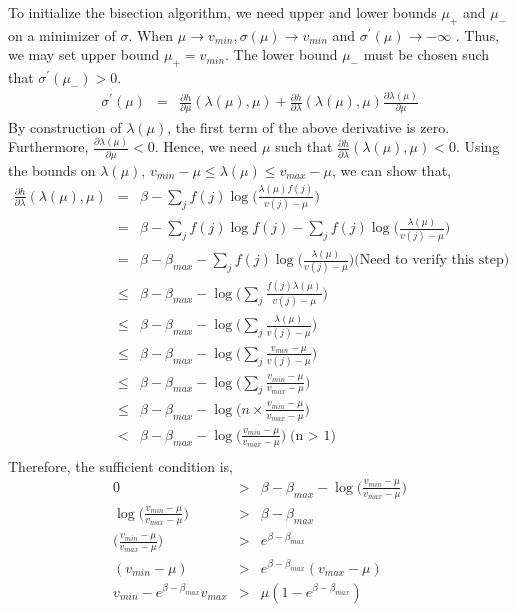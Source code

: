 To initialize the bisection algorithm, we need upper and lower bounds $\mu_+$ and $\mu_-$ on a minimizer of $\sigma$. When $\mu \rightarrow v_{min}, \sigma(\mu) \rightarrow v_{min}$ and $\sigma^{'}(\mu) \rightarrow -\infty$ . Thus, we may set upper bound $\mu_+ = v_{min}$. The lower bound $\mu_-$ must be chosen such that $\sigma^{'}(\mu_-) > 0$.
\begin{eqnarray*}
\sigma^{'}(\mu) &=& \frac{\partial h}{\partial \mu} (\lambda(\mu), \mu) + \frac{\partial h}{\partial \lambda} (\lambda(\mu), \mu) \frac{\partial \lambda(\mu)}{\partial \mu}
\end{eqnarray*}
By construction of $\lambda(\mu)$, the first term of the above derivative is zero. Furthermore, $\frac{\partial \lambda(\mu)}{\partial \mu} < 0$. Hence, we need $\mu$ such that $\frac{\partial h}{\partial \lambda} (\lambda(\mu), \mu) < 0$. Using the bounds on $\lambda(\mu)$, $v_{min} - \mu \leq \lambda(\mu) \leq v_{max} - \mu$, we can show that,
\begin{eqnarray*}
\frac{\partial h}{\partial \lambda} (\lambda(\mu), \mu) &=& \beta - \sum_{j}f(j) \log\bigg(\frac{\lambda(\mu) f(j)}{v(j) - \mu}\bigg) \\
&=& \beta - \sum_{j}f(j)\log f(j) - \sum_{j}f(j)\log\bigg(\frac{\lambda(\mu)}{v(j) - \mu}\bigg) \\
&=& \beta - \beta_{max} - \sum_{j}f(j)\log\bigg(\frac{\lambda(\mu)}{v(j) - \mu}\bigg) \textrm{(Need to verify this step)}\\
&\leq& \beta - \beta_{max} - \log\bigg(\sum_{j}\frac{f(j)\lambda(\mu)}{v(j) - \mu}\bigg) \\
&\leq& \beta - \beta_{max} - \log\bigg(\sum_{j}\frac{\lambda(\mu)}{v(j) - \mu}\bigg) \\
&\leq& \beta - \beta_{max} - \log\bigg(\sum_{j}\frac{v_{min} - \mu}{v(j) - \mu}\bigg) \\
&\leq& \beta - \beta_{max} - \log\bigg(\sum_{j}\frac{v_{min} - \mu}{v_{max} - \mu}\bigg) \\
&\leq& \beta - \beta_{max} - \log\bigg(n \times \frac{v_{min} - \mu}{v_{max} - \mu}\bigg) \\
&<& \beta - \beta_{max} - \log\bigg(\frac{v_{min} - \mu}{v_{max} - \mu}\bigg) \textrm{(n $>$ 1)}\\
\end{eqnarray*}
Therefore, the sufficient condition is,
\begin{eqnarray*}
0 &>& \beta - \beta_{max} - \log\bigg(\frac{v_{min} - \mu}{v_{max} - \mu}\bigg) \\
\log\bigg(\frac{v_{min} - \mu}{v_{max} - \mu}\bigg) &>& \beta - \beta_{max} \\
\bigg(\frac{v_{min} - \mu}{v_{max} - \mu}\bigg) &>& e^{\beta - \beta_{max}} \\
(v_{min} - \mu) &>& e^{\beta - \beta_{max}}(v_{max} - \mu) \\
v_{min} - e^{\beta - \beta_{max}}v_{max} &>& \mu(1 - e^{\beta - \beta_{max}}) \\
\end{eqnarray*}
